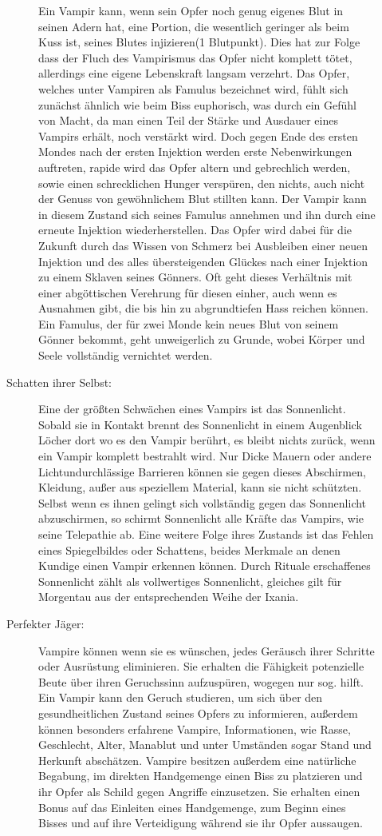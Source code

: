 \documentclass[a4paper,12pt,oneside]{book}
\begin{document}
\begin{description}
\begin{description}
Ein Vampir kann, wenn sein Opfer noch genug eigenes Blut in seinen Adern hat, eine Portion, die wesentlich geringer als beim Kuss ist, seines Blutes injizieren(1 Blutpunkt). Dies hat zur Folge dass der Fluch des Vampirismus das Opfer nicht komplett tötet, allerdings eine eigene Lebenskraft langsam verzehrt. Das Opfer, welches unter Vampiren als Famulus bezeichnet wird, fühlt sich zunächst ähnlich wie beim Biss euphorisch, was durch ein Gefühl von Macht, da man einen Teil der Stärke und Ausdauer eines Vampirs erhält, noch verstärkt wird. Doch gegen Ende des ersten Mondes nach der ersten Injektion werden erste Nebenwirkungen auftreten, rapide wird das Opfer altern und gebrechlich werden, sowie einen schrecklichen Hunger verspüren, den nichts, auch nicht der Genuss von gewöhnlichem Blut stillten kann. Der Vampir kann in diesem Zustand sich seines Famulus annehmen und ihn durch eine erneute Injektion wiederherstellen. Das Opfer wird dabei für die Zukunft durch das Wissen von Schmerz bei Ausbleiben einer neuen Injektion und des alles übersteigenden Glückes nach einer Injektion zu einem Sklaven seines Gönners. Oft geht dieses Verhältnis mit einer abgöttischen Verehrung für diesen einher, auch wenn es Ausnahmen gibt, die bis hin zu abgrundtiefen Hass reichen können. Ein Famulus, der für zwei Monde kein neues Blut von seinem Gönner bekommt, geht unweigerlich zu Grunde, wobei Körper und Seele vollständig vernichtet werden.
\item[Schatten ihrer Selbst:]
Eine der größten Schwächen eines Vampirs ist das Sonnenlicht. Sobald sie in Kontakt brennt des Sonnenlicht in einem Augenblick Löcher dort wo es den Vampir berührt, es bleibt nichts zurück, wenn ein Vampir komplett bestrahlt wird. Nur Dicke Mauern oder andere Lichtundurchlässige Barrieren können sie gegen dieses Abschirmen, Kleidung, außer aus speziellem Material, kann sie nicht schützten. Selbst wenn es ihnen gelingt sich vollständig gegen das Sonnenlicht abzuschirmen, so schirmt Sonnenlicht alle Kräfte das Vampirs, wie seine Telepathie ab. Eine weitere Folge ihres Zustands ist das Fehlen eines Spiegelbildes oder Schattens, beides Merkmale an denen Kundige einen Vampir erkennen können. Durch Rituale erschaffenes Sonnenlicht zählt als vollwertiges Sonnenlicht, gleiches gilt für Morgentau aus der entsprechenden Weihe der Ixania.
\item[Perfekter Jäger:]
Vampire können wenn sie es wünschen, jedes Geräusch ihrer Schritte oder Ausrüstung eliminieren. Sie erhalten die Fähigkeit potenzielle Beute über ihren Geruchssinn aufzuspüren, wogegen nur sog. \uline{} hilft. Ein Vampir kann den Geruch studieren, um sich über den gesundheitlichen Zustand seines Opfers zu informieren, außerdem können besonders erfahrene Vampire, Informationen, wie Rasse, Geschlecht, Alter, Manablut und unter Umständen sogar Stand und Herkunft abschätzen. Vampire besitzen außerdem eine natürliche Begabung, im direkten Handgemenge einen Biss zu platzieren und ihr Opfer als Schild gegen Angriffe einzusetzen. Sie erhalten einen Bonus auf das Einleiten eines Handgemenge, zum Beginn eines Bisses und auf ihre Verteidigung während sie ihr Opfer aussaugen.

\end{description}
\end{description}
\end{document}
